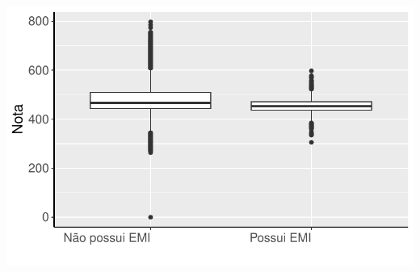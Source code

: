 \documentclass[
  letterpaper,
  DIV=11,
  numbers=noendperiod]{scrartcl}
\begin{document}
\includegraphics[width=1\textwidth,height=1\textheight]{script_files/figure-latex/unnamed-chunk-9-5.pdf}
\end{document}
